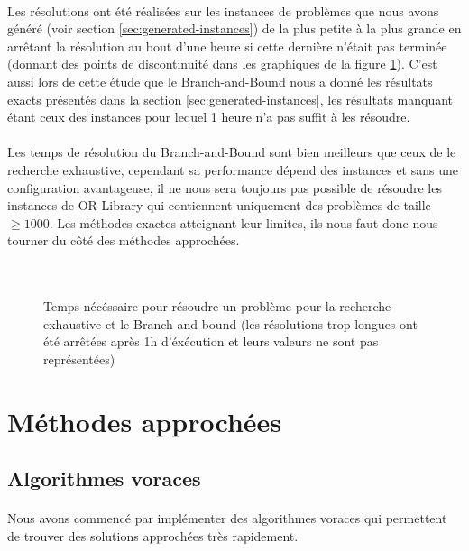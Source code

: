 \documentclass[12pt,letterpaper,twoside]{article}
\begin{document}
			\paragraph*{}
				Les résolutions ont été réalisées sur les instances de problèmes que nous avons généré (voir section \ref{sec:generated-instances}) de la plus petite à la plus grande en arrêtant la résolution au bout d'une heure si cette dernière n'était pas terminée (donnant des points de discontinuité dans les graphiques de la figure \ref{figure:plots/exhaustive_bnb_time}). C'est aussi lors de cette étude que le Branch-and-Bound nous a donné les résultats exacts présentés dans la section \ref{sec:generated-instances}, les résultats manquant étant ceux des instances pour lequel 1 heure n'a pas suffit à les résoudre.
			\paragraph*{}
				Les temps de résolution du Branch-and-Bound sont bien meilleurs que ceux de le recherche exhaustive, cependant sa performance dépend des instances et sans une configuration avantageuse, il ne nous sera toujours pas possible de résoudre les instances de OR-Library qui contiennent uniquement des problèmes de taille \(\ge 1000\). Les méthodes exactes atteignant leur limites, ils nous faut donc nous tourner du côté des méthodes approchées.
			\paragraph*{}
				\hfill{}
			\begin{figure}[H]
				\centering
				\\
				\caption{Temps nécéssaire pour résoudre un problème pour la recherche exhaustive et le Branch and bound (les résolutions trop longues ont été arrêtées après 1h d'éxécution et leurs valeurs ne sont pas représentées)}
				\label{figure:plots/exhaustive_bnb_time}
			\end{figure}
	\section{Méthodes approchées}
		\subsection{Algorithmes voraces}\label{sec:approx-greedy}
			\paragraph*{}
				Nous avons commencé par implémenter des algorithmes voraces qui permettent de trouver des solutions approchées très rapidement.
\end{document}
